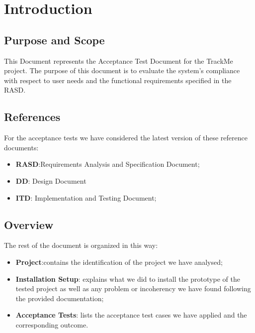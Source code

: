 \section{Introduction}

\subsection{Purpose and Scope}
	This Document represents the Acceptance Test Document for the TrackMe project. The purpose of this document is to evaluate the system's
compliance with respect to user needs and the functional requirements specified in the RASD.

\subsection{References }
For the acceptance tests we have considered the latest version of these reference documents:
\begin{itemize}
	\item \textbf{RASD}:Requirements Analysis and Specification Document;
	\item \textbf{DD}: Design Document
	\item \textbf{ITD}: Implementation and Testing Document;
\end{itemize}

\subsection{Overview }
The rest of the document is organized in this way:
\begin{itemize}
	\item \textbf{Project}:contains the identification of the project we have analysed;
	\item \textbf{Installation Setup}: explains what we did to install the prototype of the tested project as well as any problem or incoherency we have found following the provided documentation;
	\item \textbf{Acceptance Tests}: lists the acceptance test cases we have applied and the corresponding outcome.
\end{itemize}